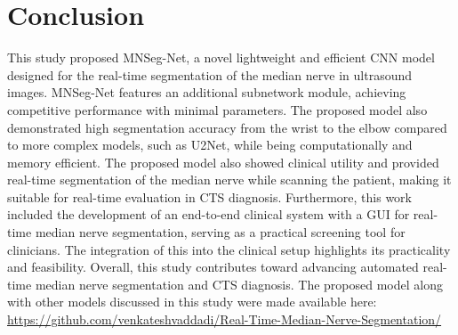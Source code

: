 
{\section{Conclusion}}
This study proposed MNSeg-Net, a novel lightweight and efficient CNN model designed for the real-time segmentation of the median nerve in ultrasound images. MNSeg-Net features an additional subnetwork module, achieving competitive performance with minimal parameters. The proposed model also demonstrated high segmentation accuracy from the wrist to the elbow compared to more complex models, such as U2Net, while being computationally and memory efficient. The proposed model also showed clinical utility and provided real-time segmentation of the median nerve while scanning the patient, making it suitable for real-time evaluation in CTS diagnosis. Furthermore, this work included the development of an end-to-end clinical system with a GUI for real-time median nerve segmentation, serving as a practical screening tool for clinicians. The integration of this into the clinical setup highlights its practicality and feasibility. Overall, this study contributes toward advancing automated real-time median nerve segmentation and CTS diagnosis. The proposed model along with other models discussed in this study were made available here: \href{https://github.com/venkateshvaddadi/Real-Time-Median-Nerve-Segmentation/}{https://github.com/venkateshvaddadi/Real-Time-Median-Nerve-Segmentation/}


